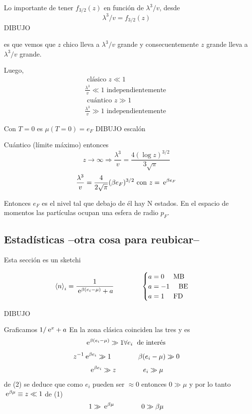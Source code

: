 \documentclass[10pt,oneside]{CBFT_book}
\begin{document}
Lo importante de tener $ f_{3/2}(z) $ en función de $ \lambda^3/v $, desde 
\[
	 \lambda^3/v  = f_{3/2}(z) 
\]
DIBUJO

es que vemos que $z$ chico lleva a $ \lambda^3/v $ grande y consecuentemente $z$ grande lleva a
$ \lambda^3/v $ grande.

Luego,
\begin{multline*}
	\text{ clásico } z \ll 1 \\
	\frac{ \lambda^3 }{ v } \ll 1 \text{ independientemente }
\end{multline*}
\begin{multline*}
	\text{ cuántico } z \gg 1 \\
	\frac{ \lambda^3 }{ v } \gg 1 \text{ independientemente }
\end{multline*}

Con $ T=0$ es $\mu(T=0)=e_F$
DIBUJO escalón

Cuántico (límite máximo) entonces
\[
	z \to \infty \Rightarrow \frac{ \lambda^3 }{ v } = \frac{4(\log z)^{3/2}}{3\sqrt{\pi}}
\]
\[
	\frac{ \lambda^3 }{ v } = \frac{4}{2\sqrt{\pi}}(\beta e_F)^{3/2} \text{ con } z=\:\mathrm{e}^{\beta e_F}
\]

Entonces $e_F$ es el nivel tal que debajo de él hay N estados. En el espacio de momentos las partículas
ocupan una esfera de radio $p_F$.


\subsection{Estadísticas --otra cosa para reubicar--}

Esta sección es un sketchi

\[
	\braket{n}_i = \frac{1}{ \:\mathrm{e}^{\beta(e_i - \mu)} + a} \qquad \qquad 
	\begin{cases}
	 a = 0 \quad \text{ MB } \\
	 a = -1 \quad \text{ BE } \\
	 a = 1 \quad \text{ FD } 
	\end{cases}
\]

DIBUJO 

Graficamos $1/ \:\mathrm{e}^x + a $
En la zona clásica coinciden las tres y es
\[
	\:\mathrm{e}^{\beta (e_i - \mu)} \gg 1 \forall e_i \; \text{ de interés }
\]
\[
	z^{-1} \:\mathrm{e}^{\beta e_i } \gg 1 \qquad \qquad \beta(e_i - \mu) \gg 0
\]
\[
	\:\mathrm{e}^{\beta e_i } \gg z \qquad \qquad e_i \gg \mu
\]
de (2) se deduce que como $e_i$ pueden ser $\approx 0$ entonces $0\gg\mu$ y por lo tanto
$\:\mathrm{e}^{\beta\mu} \equiv z \ll 1$ de (1)
\[
	1 \gg \:\mathrm{e}^{\beta\mu} \qquad \qquad 0 \gg \beta\mu
\]
\end{document}
